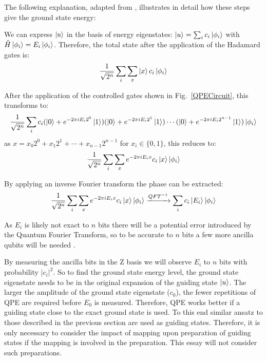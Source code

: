 \documentclass[twoside]{article}
\begin{document}
The following explanation, adapted from \cite{chemistryReview}, illustrates in detail how these steps give the ground state energy:\\
\begin{itemlist}
\item We can express $\ket{u}$ in the basis of energy eigenstates: $\ket{u} = \sum_i c_i \ket{\phi_i}$ with $\hat H \ket{\phi_i} = E_i \ket{\phi_i}$. Therefore, the total state after the application of the Hadamard gates is: 
        \begin{equation}
                \frac{1}{\sqrt{2^n}} \sum_i \sum_x \ket{x} c_i \ket{\phi_i}
        \end{equation}
\item After the application of the controlled gates shown in Fig.~\ref{QPECircuit}, this transforms to:
        \begin{equation}
        \frac{1}{\sqrt{2^n}} \sum_i c_i (\ket{0} + e^{-2\pi i  E_i 2^0}\ket{1})(\ket{0} + e^{-2\pi i E_i 2^1} \ket{1}) \cdots (\ket{0} + e^{-2\pi i  E_i 2^{n-1}}\ket{1}) \ket{\phi_i} \end{equation}
        as $x = x_0 2^0 + x_1 2^1 + \cdots + x_{n-1} 2^{n-1}$ for $x_i \in \{0,1\}$, this reduces to:
        \begin{equation}
                \frac{1}{\sqrt{2^n}} \sum_i \sum_x e^{-2\pi i E_i x}c_i \ket{x}  \ket{\phi_i}
        \end{equation}
\item By applying an inverse Fourier transform the phase can be extracted:
        \begin{equation}
\frac{1}{\sqrt{2^n}} \sum_i \sum_x e^{-2\pi i E_i x}c_i \ket{x}  \ket{\phi_i} \xrightarrow{QFT^{-1}} \sum_i c_i \ket{E_i} \ket{\phi_i}
        \end{equation}
\item As $E_i$ is likely not exact to $n$ bits there will be a potential error introduced by the Quantum Fourier Transform, so to be accurate to $n$ bits a few more ancilla qubits will be needed \cite{nielsenChuang}.
\item By measuring the ancilla bits in the Z basis we will observe $E_i$ to $n$ bits with probability $|c_i|^2$.  So to find the ground state energy level, the ground state eigenstate needs to be in the original expansion of the guiding state $\ket{u}$. The larger the amplitude of the ground state eigenstate ($c_0$), the fewer repetitions of QPE are required before $E_0$ is measured. Therefore, QPE works better if a guiding state close to the exact ground state is used. To this end similar ansatz to those described in the previous section are used as guiding states. Therefore, it is only necessary to consider the impact of mapping upon preparation of guiding states if the mapping is involved in the preparation. This essay will not consider such preparations.\end{itemlist}
\end{document}
